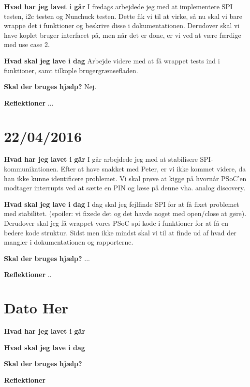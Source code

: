 \documentclass{article}
\begin{document}
	\textbf{Hvad har jeg lavet i går}
	I fredags arbejdede jeg med at implementere SPI testen, i2c testen og Nunchuck testen. Dette fik vi til at virke, så nu skal vi bare wrappe det i funktioner og beskrive disse i dokumentationen. Derudover skal vi have koplet bruger interfacet på, men når det er done, er vi ved at være færdige med use case 2.
	
	\textbf{Hvad skal jeg lave i dag}
	Arbejde videre med at få wrappet tests ind i funktioner, samt tilkople brugergrænsefladen.
	
	\textbf{Skal der bruges hjælp?}
	Nej. 
	
	\textbf{Reflektioner}
	...
	
	\section{22/04/2016}
	
	\textbf{Hvad har jeg lavet i går}
	I går arbejdede jeg med at stabilisere SPI-kommunikationen. Efter at have snakket med Peter, er vi ikke kommet videre, da han ikke kunne identificere problemet. Vi skal prøve at kigge på hvornår PSoC'en modtager interrupts ved at sætte en PIN og læse på denne vha. analog discovery.
	
	\textbf{Hvad skal jeg lave i dag}
	I dag skal jeg fejlfinde SPI for at få fixet problemet med stabilitet. (spoiler: vi fixede det og det havde noget med open/close at gøre). Derudover skal jeg få wrappet vores PSoC spi kode i funktioner for at få en bedere kode struktur. Sidst men ikke mindst skal vi til at finde ud af hvad der mangler i dokumentationen og rapporterne.
	
	
	\textbf{Skal der bruges hjælp?}
	...
	
	\textbf{Reflektioner}
	..
	
	\section{Dato Her}
	
	\textbf{Hvad har jeg lavet i går}
	
	\textbf{Hvad skal jeg lave i dag}
	
	\textbf{Skal der bruges hjælp?}
	
	\textbf{Reflektioner}
	
	
\end{document}
